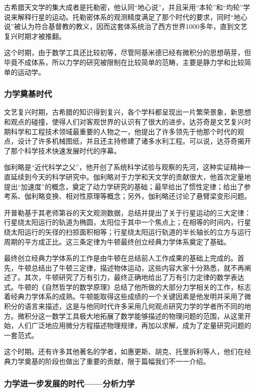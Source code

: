 古希腊天文学的集大成者是托勒密，他认同“地心说”，并且采用“本轮”和“均轮”学说来解释行星的运动。托勒密体系的观测精度满足了那个时代的要求，同时“地心说”被认为符合基督教的教义，因而这套体系统治了西方世界1000多年，直到文艺复兴时期才被推翻。

这个时期，由于数学工具还比较初等，尽管阿基米德已经有微积分的思想萌芽，但毕竟不成体系，所以力学的研究被限制在比较简单的范畴，主要是静力学和比较简单的运动学。

\subsubsection{力学奠基时代}

文艺复兴时期，古希腊的知识得到复兴，各个学科都呈现出一片繁荣景象，新思想和观点的碰撞，使得人们对客观世界的认识有了很大的进步。达芬奇是文艺复兴时期科学和工程技术领域最重要的人物之一，他提出了许多领先于他那个时代的观点，设计了许多机械图纸，并且还主持修建了诸多水利工程。可以说，达芬奇揭开了那个科学技术快速发展时代的序幕。

伽利略是“近代科学之父”，他开创了系统科学试验与观察的先河，这种实证精神一直延续到今天的科学研究中。伽利略对于力学和天文学的贡献很大，他首次定量地提出“加速度”的概念，奠定了动力学研究的基础；最早给出了惯性定律；给出了参考系、伽利略变换、相对性原理等概念；另外，伽利略还讨论了悬臂梁变形问题。

开普勒基于其老师第谷的天文观测数据，总结并提出了关于行星运动的三大定律：行星绕太阳运行的轨道为椭圆，太阳位于其中一个焦点上；在相等的时间内，行星绕太阳运行的矢径的扫掠面积相等；行星绕太阳运行轨道的半长轴长的立方与运行周期的平方成正比。这三条定律为牛顿最终创立经典力学体系奠定了基础。

最终创立经典力学体系的工作是由牛顿在总结前人工作成果的基础上完成的。首先，牛顿总结出了牛顿三定律，描述物体运动，这些内容大家十分熟悉，就不再阐述了。其次，牛顿研究了万有引力，最终正确地给出了万有引力定律的数学表达式。牛顿的《自然哲学的数学原理》总结了他所做的大部分力学相关的工作，标志着经典力学体系的成熟。牛顿能取得这些成绩的一个关键因素是他发明并采用了微积分的语言来描述，这是与他同时代许多采用几何观点研究力学的学者所不同的地方。微积分这一数学工具极大地拓展了数学能够描述的物理问题的范围，从这里开始，人们广泛地应用微分方程描述物理规律，再加以求解，成为了定量研究问题的一套范式。

这个时期。还有许多其他著名的学者，如惠更斯、胡克、托里拆利等人，他们在经典力学奠基的阶段也做出了重要的贡献，限于篇幅我们不一一介绍。

\subsubsection{力学进一步发展的时代——分析力学}

